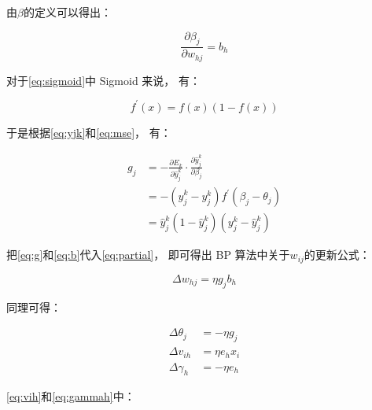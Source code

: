 由$\beta$的定义可以得出：

\begin{equation}
    \label{eq:b}
    \frac{\partial \beta_j}{\partial w_{hj}} = b_h
\end{equation}

对于\cref{eq:sigmoid}中 Sigmoid 来说，
有：

\begin{equation}
    f^{\prime}\left(x\right) = f\left(x\right)\left(1-f\left(x\right)\right)
\end{equation}

于是根据\cref{eq:yjk}和\cref{eq:mse}，
有：

\begin{equation}
    \label{eq:g}
    \begin{aligned}
        g _ { j } & = - \frac { \partial E _ { k } } { \partial \hat { y } _ { j } ^ { k } } \cdot \frac { \partial \hat { y } _ { j } ^ { k } } { \partial \beta _ { j } } \\
                  & = - ( \hat { y } _ { j } ^ { k } - y _ { j } ^ { k } ) f ^ { \prime } ( \beta _ { j } - \theta _ { j } )                                                \\
                  & = \hat { y } _ { j } ^ { k } ( 1 - \hat { y } _ { j } ^ { k } ) ( y _ { j } ^ { k } - \hat { y } _ { j } ^ { k } )
    \end{aligned}
\end{equation}

把\cref{eq:g}和\cref{eq:b}代入\cref{eq:partial}，
即可得出 BP 算法中关于$w_{ij}$的更新公式：

\begin{equation}
    \label{eq:whj}
    \Delta w_{hj} = \eta g_jb_h
\end{equation}

同理可得：

\begin{align}
    \Delta\theta_j                   & = -\eta g_j   \\
    \label{eq:vih}\Delta v_{ih}      & = \eta e_hx_i \\
    \label{eq:gammah}\Delta \gamma_h & = -\eta e_h
\end{align}

\cref{eq:vih}和\cref{eq:gammah}中：

